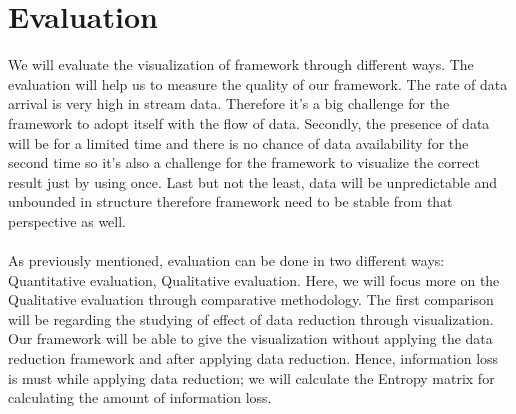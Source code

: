 \chapter{Evaluation}
\label{cha:eval}

We will evaluate the visualization of framework through different ways. The evaluation will help us to measure the quality of our framework. The rate of data arrival is very high in stream data. Therefore it's a big challenge for the framework to adopt itself with the flow of data. Secondly, the presence of data will be for a limited time and there is no chance of data availability for the second time so it's also a challenge for the framework to visualize the correct result just by using once. Last but not the least, data will be unpredictable and unbounded in structure therefore framework need to be stable from that perspective as well.\\\\
As previously mentioned, evaluation can be done in two different ways: Quantitative evaluation, Qualitative evaluation. Here, we will focus more on the Qualitative evaluation through comparative methodology. The first comparison will be regarding the studying of effect of data reduction through visualization. Our framework will be able to give the visualization without applying the data reduction framework and after applying data reduction. Hence, information loss is must while applying data reduction; we will calculate the Entropy matrix for calculating the amount of information loss.\\\\
